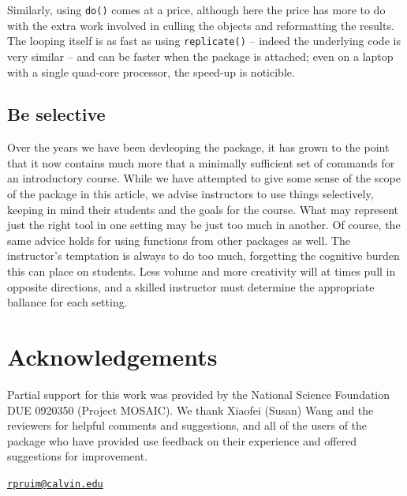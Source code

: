Similarly, using \texttt{do()} comes at a price, although here the price
has more to do with the extra work involved in culling the objects and
reformatting the results. The looping itself is as fast as using
\texttt{replicate()} -- indeed the underlying code is very similar --
and can be faster when the  package is attached; even
on a laptop with a single quad-core processor, the speed-up is
noticible.

\subsection{Be selective}\label{be-selective}

Over the years we have been devleoping the  package, it has
grown to the point that it now contains much more that a minimally
sufficient set of commands for an introductory course. While we have
attempted to give some sense of the scope of the package in this
article, we advise instructors to use things selectively, keeping in
mind their students and the goals for the course. What may represent
just the right tool in one setting may be just too much in another. Of
course, the same advice holds for using functions from other packages as
well. The instructor's temptation is always to do too much, forgetting
the cognitive burden this can place on students. Less volume and more
creativity will at times pull in opposite directions, and a skilled
instructor must determine the appropriate ballance for each setting.

\section{Acknowledgements}\label{acknowledgements}

Partial support for this work was provided by the National Science
Foundation DUE 0920350 (Project MOSAIC). We thank Xiaofei (Susan) Wang
and the reviewers for helpful comments and suggestions, and all of the
users of the  package who have provided use feedback on
their experience and offered suggestions for improvement.



\address{%
Randall Pruim\\
Calvin College\\
Department of Mathematics and Statistics\\ 3201 Burton St SE\\ Grand Rapids, MI 49546\\
}
\href{mailto:rpruim@calvin.edu}{\nolinkurl{rpruim@calvin.edu}}

